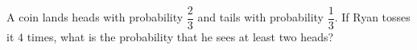 A coin lands heads with probability $\dfrac{2}{3}$ and tails with probability $\dfrac{1}{3}$. If Ryan tosses it $4$ times, what is the probability that he sees at least two heads?
